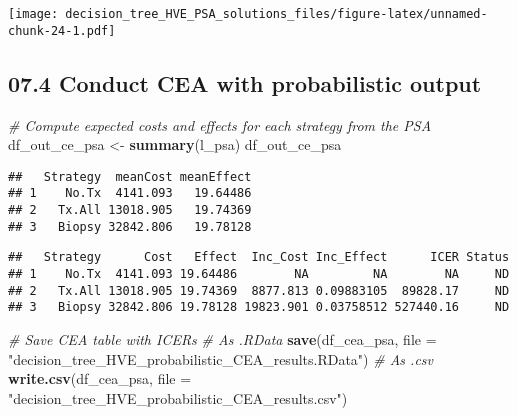 \documentclass[
]{article}
\newenvironment{Shaded}{\begin{snugshade}}{\end{snugshade}}
\newcommand{\CommentTok}[1]{\textcolor[rgb]{0.56,0.35,0.01}{\textit{#1}}}
\newcommand{\DataTypeTok}[1]{\textcolor[rgb]{0.13,0.29,0.53}{#1}}
\newcommand{\KeywordTok}[1]{\textcolor[rgb]{0.13,0.29,0.53}{\textbf{#1}}}
\newcommand{\NormalTok}[1]{#1}
\newcommand{\OperatorTok}[1]{\textcolor[rgb]{0.81,0.36,0.00}{\textbf{#1}}}
\newcommand{\StringTok}[1]{\textcolor[rgb]{0.31,0.60,0.02}{#1}}
\begin{document}
\texttt{[image: decision\_tree\_HVE\_PSA\_solutions\_files/figure-latex/unnamed-chunk-24-1.pdf]}

\hypertarget{conduct-cea-with-probabilistic-output}{%
\subsection{07.4 Conduct CEA with probabilistic
output}\label{conduct-cea-with-probabilistic-output}}

\begin{Shaded}
\begin{Highlighting}[]
\CommentTok{# Compute expected costs and effects for each strategy from the PSA}
\NormalTok{df_out_ce_psa <-}\StringTok{ }\KeywordTok{summary}\NormalTok{(l_psa)}
\NormalTok{df_out_ce_psa}
\end{Highlighting}
\end{Shaded}

\begin{verbatim}
##   Strategy  meanCost meanEffect
## 1    No.Tx  4141.093   19.64486
## 2   Tx.All 13018.905   19.74369
## 3   Biopsy 32842.806   19.78128
\end{verbatim}

\begin{Shaded}
\end{Shaded}

\begin{verbatim}
##   Strategy      Cost   Effect  Inc_Cost Inc_Effect      ICER Status
## 1    No.Tx  4141.093 19.64486        NA         NA        NA     ND
## 2   Tx.All 13018.905 19.74369  8877.813 0.09883105  89828.17     ND
## 3   Biopsy 32842.806 19.78128 19823.901 0.03758512 527440.16     ND
\end{verbatim}

\begin{Shaded}
\begin{Highlighting}[]
\CommentTok{# Save CEA table with ICERs}
\CommentTok{# As .RData}
\KeywordTok{save}\NormalTok{(df_cea_psa, }
     \DataTypeTok{file =} \StringTok{"decision_tree_HVE_probabilistic_CEA_results.RData"}\NormalTok{)}
\CommentTok{# As .csv}
\KeywordTok{write.csv}\NormalTok{(df_cea_psa, }
          \DataTypeTok{file =} \StringTok{"decision_tree_HVE_probabilistic_CEA_results.csv"}\NormalTok{)}
\end{Highlighting}
\end{Shaded}
\end{document}
